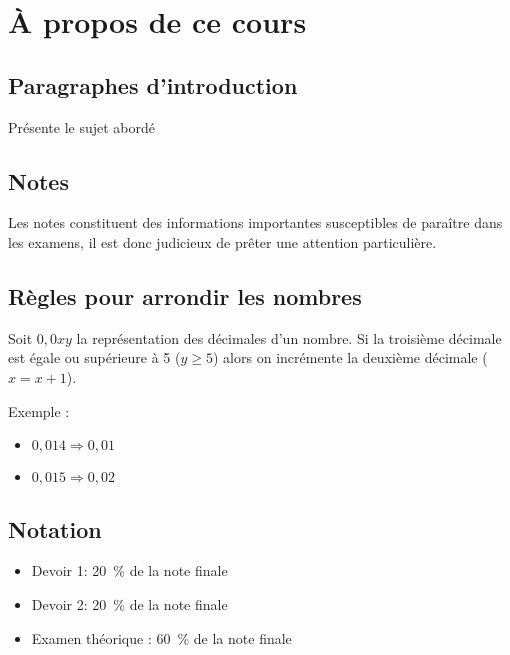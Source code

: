 \chapter*{À propos de ce cours}



\section*{Paragraphes d'introduction}
\begin{intro}
	Présente le sujet abordé 
\end{intro}



\section*{Notes}
\begin{note}
	Les notes constituent des informations importantes susceptibles de paraître dans les examens, il est donc judicieux de prêter une attention particulière. 
\end{note}






\section*{Règles pour arrondir les nombres}
Soit $0,0xy$ la représentation des décimales d'un nombre. Si la troisième décimale est égale ou supérieure à 5 ($y \geq 5$) alors on incrémente la deuxième décimale ($x = x + 1$).

Exemple :
\begin{itemize}
	\item $0,014 \Rightarrow 0,01$
	\item $0,015 \Rightarrow 0,02$
\end{itemize}



\section*{Notation}
\begin{itemize}
	\item Devoir 1: 20~\% de la note finale
	\item Devoir 2: 20~\% de la note finale
	\item Examen théorique : 60~\% de la note finale
\end{itemize}
